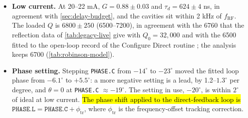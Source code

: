 \begin{itemize}
\item \textbf{Low current.} At 20--22 mA, \(G = 0.88 \pm 0.03\) and \(\tau_d = 624 \pm 4\) ns, in agreement with \cref{sec:delay-budget}, and the cavities sit within 2 kHz of \(f_\text{RF}\). The loaded \(Q\) is \(6800 \pm 250\) (6500--7200), in agreement with the 6760 that the reflection data of \cref{tab:legacy-live} give with \(Q_0 = 32{,}000\) and with the 6500 fitted to the open-loop record of the Configure Direct routine ; the analysis keeps 6700 (\cref{tab:robinson-model}).
\item \textbf{Phase setting.} Stepping \texttt{PHASE.C} from \(-14^\circ\) to \(-23^\circ\) moved the fitted loop phase from \(-6.1^\circ\) to \(+5.5^\circ\): a more negative setting is a lead, by 1.2--\(1.3^\circ\) per degree, and \(\theta = 0\) at \texttt{PHASE.C} \(\approx -19^\circ\). The setting in use, \(-20^\circ\), is within \(2^\circ\) of ideal at low current. \hl{The phase shift applied to the direct-feedback loop is} \(\mathtt{PHASE.L} = \mathtt{PHASE.C} + \phi_{\mathrm{tr}}\), where \(\phi_{\mathrm{tr}}\) is the frequency-offset tracking correction.

\end{itemize}
